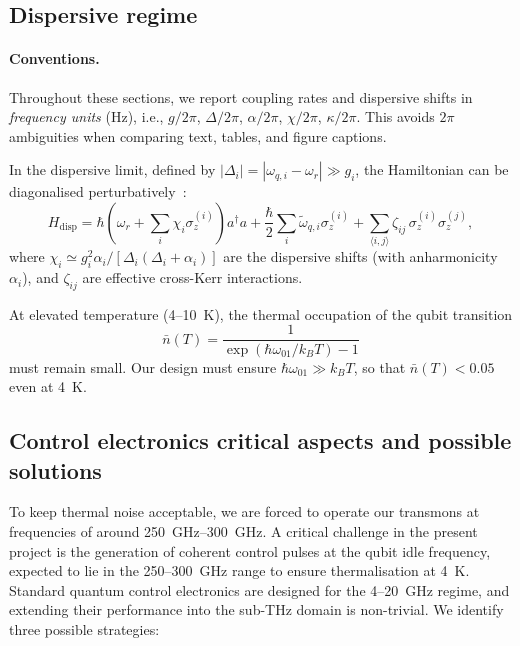 \subsection{Dispersive regime}

\paragraph{Conventions.}
Throughout these sections, we report coupling rates and dispersive shifts in \emph{frequency units} (Hz),
i.e., \(g/2\pi\), \(\Delta/2\pi\), \(\alpha/2\pi\), \(\chi/2\pi\), \(\kappa/2\pi\).
This avoids \(2\pi\) ambiguities when comparing text, tables, and figure captions.

In the dispersive limit, defined by $|\Delta_i| = |\omega_{q,i}-\omega_r|\gg g_i$, the Hamiltonian can be diagonalised perturbatively~\cite{blais2021circuit}:
\begin{equation}
H_{\mathrm{disp}} = \hbar \left(\omega_r + \sum_i \chi_i \sigma_z^{(i)}\right) a^\dagger a +
\frac{\hbar}{2}\sum_i \tilde{\omega}_{q,i}\sigma_z^{(i)} +
\sum_{\langle i,j\rangle}\zeta_{ij}\,\sigma_z^{(i)}\sigma_z^{(j)},
\end{equation}
where $\chi_i \simeq g_i^2 \alpha_i /[\Delta_i(\Delta_i+\alpha_i)]$ are the dispersive shifts (with anharmonicity $\alpha_i$), and $\zeta_{ij}$ are effective cross-Kerr interactions.

At elevated temperature (4--10~K), the thermal occupation of the qubit transition
\begin{equation}
\bar{n}(T) = \frac{1}{\exp(\hbar \omega_{01}/k_BT)-1}
\end{equation}
must remain small. Our design must ensure $\hbar\omega_{01} \gg k_BT$, so that $\bar{n}(T)<0.05$ even at 4~K.

\subsection{Control electronics critical aspects and possible solutions}
\label{subsec:control-electronics}

To keep thermal noise acceptable, we are forced to operate our transmons at frequencies of around \SIrange{250}{300} {GHz}. A critical challenge in the present project is the generation of coherent control
pulses at the qubit idle frequency, expected to lie in the 250--300~GHz range
to ensure thermalisation at 4~K. Standard quantum control electronics are designed 
for the 4--20~GHz regime, and extending their performance into the sub-THz domain 
is non-trivial. We identify three possible strategies:


